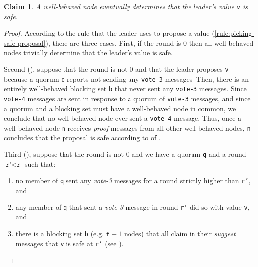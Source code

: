 \documentclass[11pt]{article}
\newtheorem{claim}{Claim}
\begin{document}
\begin{claim}
  \label{claim:proposal_determined_safe}
  A well-behaved node eventually determines that the leader's value \texttt{v} is safe.
\end{claim}
\begin{proof}
  According to the rule that the leader uses to propose a value (\cref{rule:picking-safe-proposal}), there are three cases. First, if the round is 0 then all well-behaved nodes trivially determine that the leader's value is safe. 

  Second (), suppose that the round is not 0 and that the leader proposes \texttt{v} because a quorum \texttt{q} reports not sending any \texttt{vote-3} messages. Then, there is an entirely well-behaved blocking set \texttt{b} that never sent any \texttt{vote-3} messages. Since \texttt{vote-4} messages are sent in response to a quorum of \texttt{vote-3} messages, and since a quorum and a blocking set must have a well-behaved node in common, we conclude that no well-behaved node ever sent a \texttt{vote-4} message. Thus, once a well-behaved node \texttt{n} receives \textit{proof} messages from all other well-behaved nodes, \texttt{n} concludes that the proposal is safe according to  of .

  Third (), suppose that the round is not 0 and we have a quorum \texttt{q} and a round $\texttt{r'}< \texttt{r}$ such that:
  \begin{enumerate}
    \item no member of \texttt{q} sent any \textit{vote-3} messages for a
      round strictly higher than \texttt{r'}, and
      \label{item:one}
    \item any member of \texttt{q} that sent a \textit{vote-3} message in
      round \texttt{r'} did so with value \texttt{v}, and
      \label{item:two}
    \item there is a blocking set \texttt{b} (e.g. $ \texttt{f} +1$
      nodes) that all claim in their \textit{suggest} messages that
      \texttt{v} is safe at \texttt{r'} (see ).
      \label{item:three}
  \end{enumerate}


\end{proof}
\end{document}
